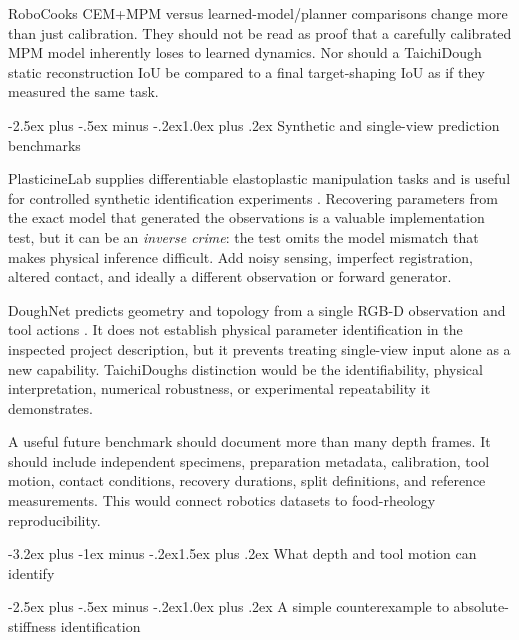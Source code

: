 \documentclass[
  11pt,
]{article}
\makeatletter
\renewcommand\section{\needspace{7\baselineskip}\@startsection{section}{1}{\z@}%
  {-3.2ex plus -1ex minus -.2ex}{1.5ex plus .2ex}%
  {\normalfont\sffamily\Large\bfseries\color{accent}}}
\renewcommand\subsection{\needspace{5\baselineskip}\@startsection{subsection}{2}{\z@}%
  {-2.5ex plus -.5ex minus -.2ex}{1.0ex plus .2ex}%
  {\normalfont\sffamily\large\bfseries\color{accent}}}
\makeatother
\begin{document}
RoboCook\textquotesingle s CEM+MPM versus learned-model/planner
comparisons change more than just calibration. They should not be read
as proof that a carefully calibrated MPM model inherently loses to
learned dynamics. Nor should a TaichiDough static reconstruction IoU be
compared to a final target-shaping IoU as if they measured the same
task.

\subsection{Synthetic and single-view prediction
benchmarks}\label{synthetic-and-single-view-prediction-benchmarks}

PlasticineLab supplies differentiable elastoplastic manipulation tasks
and is useful for controlled synthetic identification experiments
. Recovering parameters from
the exact model that generated the observations is a valuable
implementation test, but it can be an \emph{inverse crime}: the test
omits the model mismatch that makes physical inference difficult. Add
noisy sensing, imperfect registration, altered contact, and ideally a
different observation or forward generator.

DoughNet predicts geometry and topology from a single RGB-D observation
and tool actions . It does not
establish physical parameter identification in the inspected project
description, but it prevents treating single-view input alone as a new
capability. TaichiDough\textquotesingle s distinction would be the
identifiability, physical interpretation, numerical robustness, or
experimental repeatability it demonstrates.

A useful future benchmark should document more than many depth frames.
It should include independent specimens, preparation metadata,
calibration, tool motion, contact conditions, recovery durations, split
definitions, and reference measurements. This would connect robotics
datasets to food-rheology reproducibility.

\section{What depth and tool motion can
identify}\label{what-depth-and-tool-motion-can-identify}

\subsection{A simple counterexample to absolute-stiffness
identification}\label{a-simple-counterexample-to-absolute-stiffness-identification}
\end{document}
